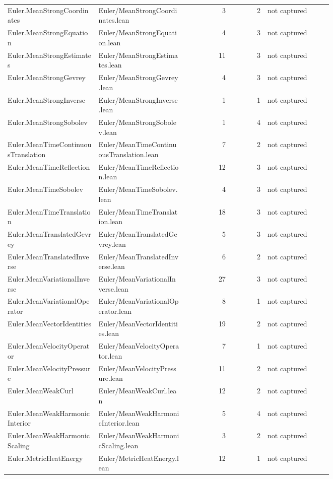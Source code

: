 \documentclass[10pt]{article}
\begin{document}
\begin{longtable}{p{0.28\linewidth}p{0.27\linewidth}r r p{0.20\linewidth}}
Euler.MeanStrongCoordinates & Euler/MeanStrongCoordinates.lean & 3 & 2 & not captured\\
Euler.MeanStrongEquation & Euler/MeanStrongEquation.lean & 4 & 3 & not captured\\
Euler.MeanStrongEstimates & Euler/MeanStrongEstimates.lean & 11 & 3 & not captured\\
Euler.MeanStrongGevrey & Euler/MeanStrongGevrey.lean & 4 & 3 & not captured\\
Euler.MeanStrongInverse & Euler/MeanStrongInverse.lean & 1 & 1 & not captured\\
Euler.MeanStrongSobolev & Euler/MeanStrongSobolev.lean & 1 & 4 & not captured\\
Euler.MeanTimeContinuousTranslation & Euler/MeanTimeContinuousTranslation.lean & 7 & 2 & not captured\\
Euler.MeanTimeReflection & Euler/MeanTimeReflection.lean & 12 & 3 & not captured\\
Euler.MeanTimeSobolev & Euler/MeanTimeSobolev.lean & 4 & 3 & not captured\\
Euler.MeanTimeTranslation & Euler/MeanTimeTranslation.lean & 18 & 3 & not captured\\
Euler.MeanTranslatedGevrey & Euler/MeanTranslatedGevrey.lean & 5 & 3 & not captured\\
Euler.MeanTranslatedInverse & Euler/MeanTranslatedInverse.lean & 6 & 2 & not captured\\
Euler.MeanVariationalInverse & Euler/MeanVariationalInverse.lean & 27 & 3 & not captured\\
Euler.MeanVariationalOperator & Euler/MeanVariationalOperator.lean & 8 & 1 & not captured\\
Euler.MeanVectorIdentities & Euler/MeanVectorIdentities.lean & 19 & 2 & not captured\\
Euler.MeanVelocityOperator & Euler/MeanVelocityOperator.lean & 7 & 1 & not captured\\
Euler.MeanVelocityPressure & Euler/MeanVelocityPressure.lean & 11 & 2 & not captured\\
Euler.MeanWeakCurl & Euler/MeanWeakCurl.lean & 12 & 2 & not captured\\
Euler.MeanWeakHarmonicInterior & Euler/MeanWeakHarmonicInterior.lean & 5 & 4 & not captured\\
Euler.MeanWeakHarmonicScaling & Euler/MeanWeakHarmonicScaling.lean & 3 & 2 & not captured\\
Euler.MetricHeatEnergy & Euler/MetricHeatEnergy.lean & 12 & 1 & not captured\\

\end{longtable}
\end{document}
